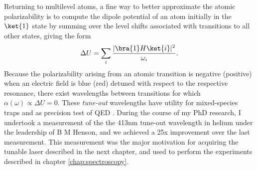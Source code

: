 Returning to multilevel atoms, a fine way to better approximate the atomic polarizability is to compute the dipole potential of an atom initially in the $\ket{1}$ state by summing over the level shifts associated with transitions to all other states, giving the form
	\begin{equation}
		\Delta U = \sum_i \frac{|\bra{1}H\ket{i}|^2}{\omega_i}.
	\end{equation}
	Because the polarizability arising from an atomic transition is negative (positive) when an electric field is blue (red) detuned with respect to the respective resonance, there exist wavelengths between transitions for which $\alpha(\omega)\propto\Delta U = 0$. These \emph{tune-out} wavelengths have utility for mixed-species traps and as precision test of QED \cite{henson15,mitroy13,TOforthcoming}. During the course of my PhD research, I undertook a measurement of the the 413nm tune-out wavelength in helium under the leadership of B M Henson, and we achieved a 25x improvement over the last measurement. This measurement was the major motivation for acquiring the tunable laser described in the next chapter, and used to perform the experiments described in chapter \ref{chap:spectroscopy}.